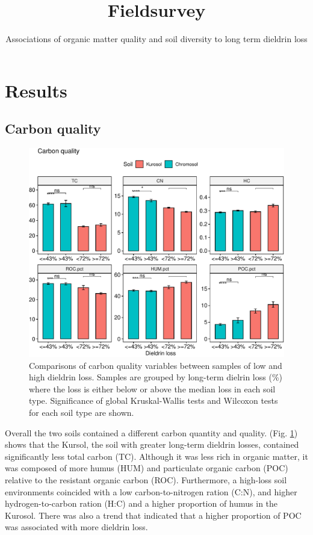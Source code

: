 \documentclass[
]{article}
\title{Fieldsurvey}
\subtitle{Associations of organic matter quality and soil diversity to long term dieldrin loss}
\author{}
\date{\vspace{-2.5em}}
\begin{document}
\maketitle

{
\setcounter{tocdepth}{2}
\tableofcontents
}
\hypertarget{results}{%
\section{Results}\label{results}}

\hypertarget{carbon-quality}{%
\subsection{Carbon quality}\label{carbon-quality}}

\begin{figure}
\centering
\includegraphics{M2_Results_files/figure-latex/carbonquality-1.pdf}
\caption{\label{fig:carbonquality}Comparisons of carbon quality variables between samples of low and high dieldrin loss. Samples are grouped by long-term dielrin loss (\%) where the loss is either below or above the median loss in each soil type. Significance of global Kruskal-Wallis tests and Wilcoxon tests for each soil type are shown.}
\end{figure}

Overall the two soils contained a different carbon quantity and quality. (Fig. \ref{fig:carbonquality}) shows that the Kursol, the soil with greater long-term dieldrin losses, contained significantly less total carbon (TC). Although it was less rich in organic matter, it was composed of more humus (HUM) and particulate organic carbon (POC) relative to the resistant organic carbon (ROC). Furthermore, a high-loss soil environments coincided with a low carbon-to-nitrogen ration (C:N), and higher hydrogen-to-carbon ration (H:C) and a higher proportion of humus in the Kurosol.
There was also a trend that indicated that a higher proportion of POC was associated with more dieldrin loss.
\end{document}
